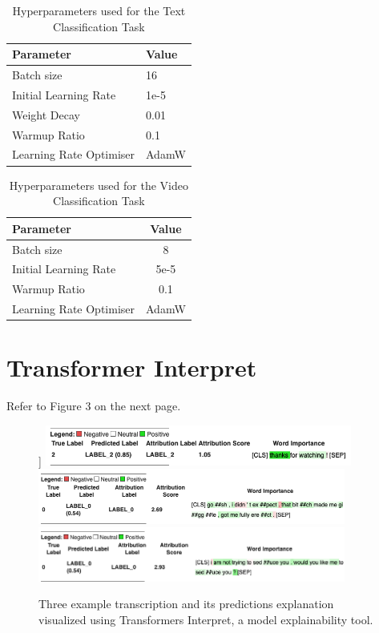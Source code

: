 \documentclass[11pt]{article}
\begin{document}
\begin{table}[H]
\centering
\begin{tabular}{l l}
\hline
 \textbf{Parameter} &  \textbf{Value} \\
 \hline
 Batch size & 16 \\
 Initial Learning Rate  & 1e-5 \\
 Weight Decay & 0.01 \\
 Warmup Ratio & 0.1 \\
 Learning Rate Optimiser & AdamW \\
\hline
\end{tabular}
\caption{Hyperparameters used for the Text Classification Task}
\end{table}

\begin{table}[H]
\centering
\begin{tabular}{lc}
\hline
 \textbf{Parameter} &  \textbf{Value} \\
 \hline
 Batch size & 8 \\
 Initial Learning Rate  & 5e-5 \\
 Warmup Ratio & 0.1 \\
 Learning Rate Optimiser & AdamW \\
\hline
\end{tabular}
\caption{Hyperparameters used for the Video Classification Task}
\end{table}
\label{appendix:d}
\section{Transformer Interpret}
Refer to Figure 3 on the next page.
\newpage
\begin{figure}[!htb]]
\centering
\includegraphics[width=0.9\textwidth]{images/transformerInterepret1.png}
\includegraphics[width=0.9\textwidth]{images/transformerInterepret2.png}
\includegraphics[width=0.9\textwidth]{images/transformerInterepret3.png}
\caption{Three example transcription and its predictions explanation  visualized using Transformers Interpret, a model explainability tool.}
\end{figure}
\end{document}
